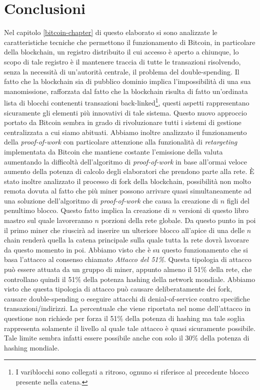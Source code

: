 
\cleardoublepage
{}

\chapter*{Conclusioni}
Nel capitolo \ref{bitcoin-chapter} di questo elaborato si sono analizzate le caratteristiche tecniche che permettono il funzionamento di Bitcoin, in particolare della blockchain, un registro distribuito il cui accesso è aperto a chiunque, lo scopo di tale registro è il mantenere traccia di tutte le transazioni risolvendo, senza la necessità di un’autorità centrale, il problema del double-spending. Il fatto che la blockchain sia di pubblico dominio implica l’impossibilità di una sua manomissione, rafforzata dal fatto che la blockchain risulta di fatto un'ordinata lista di blocchi contenenti transazioni back-linked\footnote{I variblocchi sono collegati a ritroso, ognuno si riferisce al precedente blocco presente nella catena.}, questi aspetti rappresentano sicuramente gli elementi più innovativi di tale sistema. Questo nuovo approccio portato da Bitcoin sembra in grado di rivoluzionare tutti i sistemi di gestione centralizzata a cui siamo abituati. Abbiamo inoltre analizzato il funzionamento della \textit{proof-of-work} con particolare attenzione alla funzionalità di \textit{retargeting} implementata da Bitcoin che mantiene costante l'emissione della valuta aumentando la difficoltà dell'algoritmo di \textit{proof-of-work} in base all'ormai veloce aumento della potenza di calcolo degli elaboratori che prendono parte alla rete. \`E stato inoltre analizzato il processo di fork della blockchain, possibilità non molto remota dovuta al fatto che più miner possono arrivare quasi simultaneamente ad una soluzione dell'algoritmo di \textit{proof-of-work} che causa la creazione di $n$ figli del penultimo blocco. Questo fatto implica la creazione di $n$ versioni di questo libro mastro sul quale lavoreranno $n$ porzioni della rete globale. Da questo punto in poi il primo miner che riuscirà ad inserire un ulteriore blocco all'apice di una delle $n$ chain renderà quella la catena principale sulla quale tutta la rete dovrà lavorare da questo momento in poi. Abbiamo visto che è su questo funzionamento che si basa l'attacco al consenso chiamato \textit{Attacco del 51\%}. Questa tipologia di attacco può essere attuata da un gruppo di miner, appunto almeno il 51\% della rete, che controllano quindi il 51\% della potenza hashing della network mondiale. Abbiamo visto che questa tipologia di attacco può causare deliberatamente dei fork, causare double-spending o eseguire attacchi di denial-of-service contro specifiche transazioni/indirizzi. La percentuale che viene riportata nel nome dell'attacco in questione non richiede per forza il 51\% della potenza di hashing ma tale soglia rappresenta solamente il livello al quale tale attacco è quasi sicuramente possibile. Tale limite sembra infatti essere possibile anche con solo il 30\% della potenza di hashing mondiale.

